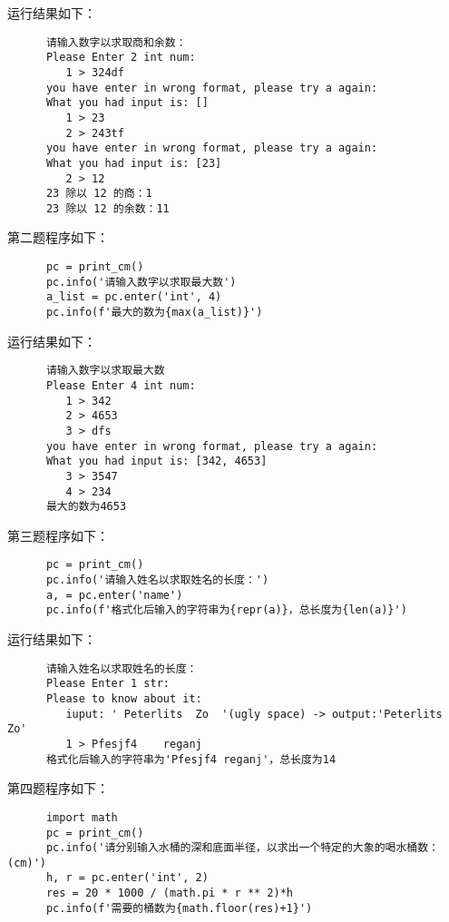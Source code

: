 \documentclass[a4paper]{ctexart}
\begin{document}
         运行结果如下：
      \begin{verbatim}
      请输入数字以求取商和余数：
      Please Enter 2 int num:
         1 > 324df
      you have enter in wrong format, please try a again:
      What you had input is: []
         1 > 23
         2 > 243tf
      you have enter in wrong format, please try a again:
      What you had input is: [23]
         2 > 12
      23 除以 12 的商：1
      23 除以 12 的余数：11
      \end{verbatim}

         第二题程序如下：
      \begin{verbatim}
      pc = print_cm()
      pc.info('请输入数字以求取最大数')
      a_list = pc.enter('int', 4)
      pc.info(f'最大的数为{max(a_list)}')
      \end{verbatim}

         运行结果如下：
      \begin{verbatim}
      请输入数字以求取最大数
      Please Enter 4 int num:
         1 > 342
         2 > 4653
         3 > dfs
      you have enter in wrong format, please try a again:
      What you had input is: [342, 4653]
         3 > 3547
         4 > 234
      最大的数为4653
      \end{verbatim}

         第三题程序如下：
      \begin{verbatim}
      pc = print_cm()
      pc.info('请输入姓名以求取姓名的长度：')
      a, = pc.enter('name')
      pc.info(f'格式化后输入的字符串为{repr(a)}，总长度为{len(a)}')
      \end{verbatim}

         运行结果如下：
      \begin{verbatim}
      请输入姓名以求取姓名的长度：
      Please Enter 1 str:
      Please to know about it:
         iuput: ' Peterlits  Zo  '(ugly space) -> output:'Peterlits Zo'
         1 > Pfesjf4    reganj    
      格式化后输入的字符串为'Pfesjf4 reganj'，总长度为14
      \end{verbatim}

         第四题程序如下：
      \begin{verbatim}
      import math
      pc = print_cm()
      pc.info('请分别输入水桶的深和底面半径，以求出一个特定的大象的喝水桶数：(cm)')
      h, r = pc.enter('int', 2)
      res = 20 * 1000 / (math.pi * r ** 2)*h
      pc.info(f'需要的桶数为{math.floor(res)+1}')     
      \end{verbatim}
      
\end{document}

